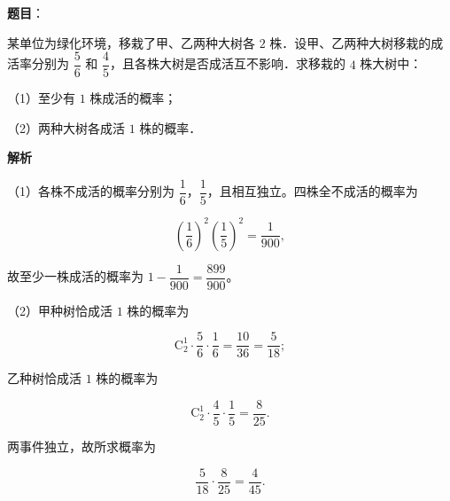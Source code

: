 \begin{answer}

\textbf{题目}：

某单位为绿化环境，移栽了甲、乙两种大树各 $2$ 株．设甲、乙两种大树移栽的成活率分别为 $\dfrac56$ 和 $\dfrac45$，且各株大树是否成活互不影响．求移栽的 $4$ 株大树中：

（1）至少有 $1$ 株成活的概率；

（2）两种大树各成活 $1$ 株的概率．

\textbf{解析}

（1）各株不成活的概率分别为 $\dfrac16$，$\dfrac15$，且相互独立。四株全不成活的概率为

\nopagebreak[4]
\[\left(\frac16\right)^2\left(\frac15\right)^2=\frac1{900},\]

故至少一株成活的概率为 $1-\dfrac1{900}=\dfrac{899}{900}$。

（2）甲种树恰成活 $1$ 株的概率为

\nopagebreak[4]
\[\mathrm C_2^1\cdot\frac56\cdot\frac16=\frac{10}{36}=\frac5{18};\]

乙种树恰成活 $1$ 株的概率为

\nopagebreak[4]
\[\mathrm C_2^1\cdot\frac45\cdot\frac15=\frac8{25}.\]

两事件独立，故所求概率为

\nopagebreak[4]
\[\frac5{18}\cdot\frac8{25}=\frac4{45}.\]


\end{answer}
